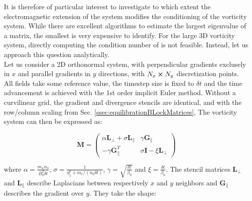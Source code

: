 It is therefore of particular interest to investigate to which extent the electromagnetic extension of the system modifies the conditioning of the vorticity system. While there are excellent algorithms to estimate the largest eigenvalue of a matrix, the smallest is very expensive to identify. For the large 3D vorticity system, directly computing the condition number of is not feasible. Instead, let us approach this question analytically. \\

Let us consider a 2D orthonormal system, with perpendicular gradients exclusely in $x$ and parallel gradients in $y$ directions, with $N_x\cross N_y$ discretization points. All fields take some reference value, the timestep size is fixed to $\delta t$ and the time advancement is achieved with the 1st order implicit Euler method. Without a curvilinear grid, the gradient and divergence stencils are identical, and with the row/column scaling from Sec. \ref{ssec:equilibrationBLockMatrices}, The vorticity system can then be expressed as:

\begin{equation}
	\textbf{M} = 
	\begin{pmatrix}
		\alpha \textbf{L}_\perp + \sigma \textbf{L}_\parallel & \gamma \textbf{G}_\parallel \\ -\gamma \textbf{G}_\parallel^T & \sigma \textbf{I} - \xi\textbf{L}_\perp
	\end{pmatrix}
\end{equation}

where $\alpha = \frac{m_un_0}{B_0^2\delta t}$, $\sigma = \frac{1}{\eta_\parallel^0 + m_e / (n_0 \delta t)}$, $\gamma = \sqrt{\frac{\delta t }{\beta_0}} $ and $\xi = \frac{\delta t}{\beta_0}$. The stencil matrices $\textbf{L}_\perp$ and $\textbf{L}_\parallel$ describe Laplacians between respectively $x$ and $y$ neighbors and $\textbf{G}_\parallel$ describes the gradient over $y$. They take the shape:

